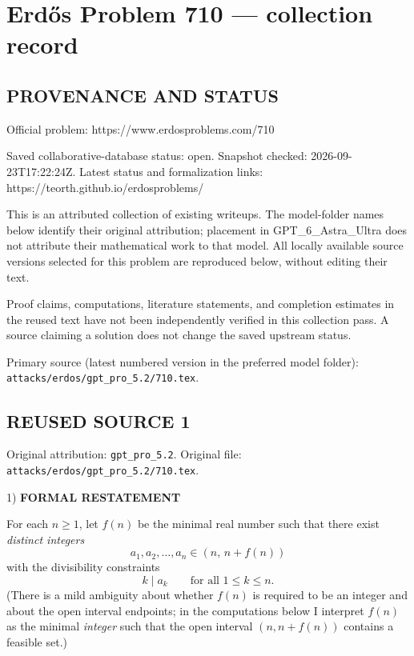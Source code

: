 \section*{Erd\H{o}s Problem 710 --- collection record}

\subsection*{PROVENANCE AND STATUS}
Official problem: https://www.erdosproblems.com/710

Saved collaborative-database status: open.
Snapshot checked: 2026-09-23T17:22:24Z.
Latest status and formalization links: https://teorth.github.io/erdosproblems/

This is an attributed collection of existing writeups. The model-folder names below identify their original attribution; placement in GPT\_6\_Astra\_Ultra does not attribute their mathematical work to that model. All locally available source versions selected for this problem are reproduced below, without editing their text.

Proof claims, computations, literature statements, and completion estimates in the reused text have not been independently verified in this collection pass. A source claiming a solution does not change the saved upstream status.

Primary source (latest numbered version in the preferred model folder): \texttt{attacks/erdos/gpt\_pro\_5.2/710.tex}.

\subsection*{REUSED SOURCE 1}
Original attribution: \texttt{gpt\_pro\_5.2}.
Original file: \texttt{attacks/erdos/gpt\_pro\_5.2/710.tex}.


1) \textbf{FORMAL RESTATEMENT}

For each $n\ge 1$, let $f(n)$ be the minimal real number such that there exist \emph{distinct integers}
\[
a_1,a_2,\dots,a_n\in (n,\,n+f(n))
\]
with the divisibility constraints
\[
 k\mid a_k\qquad\text{for all }1\le k\le n.
\]
(There is a mild ambiguity about whether $f(n)$ is required to be an integer and about the open interval endpoints; in the computations below I interpret $f(n)$ as the minimal \emph{integer} such that the open interval $(n,n+f(n))$ contains a feasible set.)

